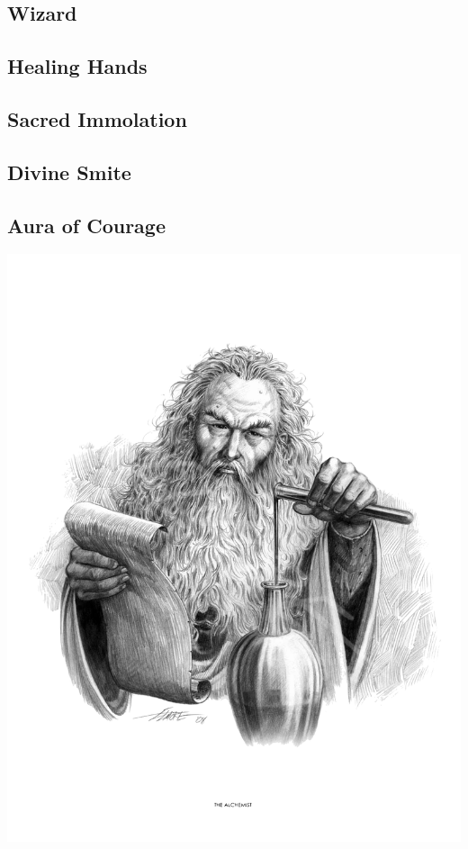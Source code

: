 
\begin{multicols*}{2}

\section{Wizard}

\subsection*{Healing Hands}

\subsection*{Sacred Immolation}

\subsection*{Divine Smite}

\subsection*{Aura of Courage}

\begin{Figure}
\centering
\includegraphics[width=\textwidth]{img/wizard.png}
\end{Figure}
    
\end{multicols*}

    